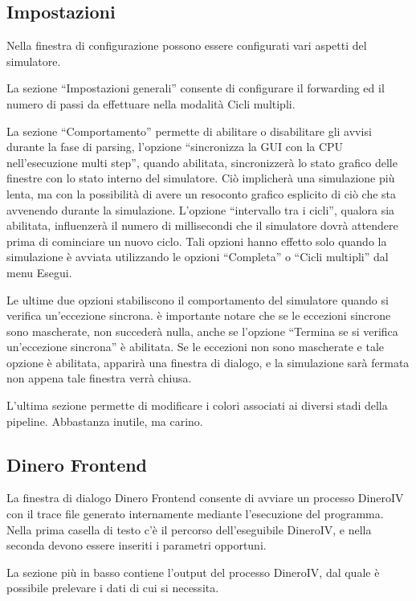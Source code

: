\documentclass[letterpaper,10pt,italian]{sphinxmanual}
\begin{document}
\subsection{Impostazioni}
\label{user-interface:impostazioni}
Nella finestra di configurazione possono essere configurati vari aspetti del
simulatore.

La sezione ``Impostazioni generali'' consente di configurare il forwarding ed il
numero di passi da effettuare nella modalità Cicli multipli.

La sezione ``Comportamento'' permette di abilitare o disabilitare gli avvisi
durante la fase di parsing, l'opzione ``sincronizza la GUI con la CPU
nell'esecuzione multi step'', quando abilitata, sincronizzerà lo stato
grafico delle finestre con lo stato interno del simulatore. Ciò
implicherà una simulazione più lenta, ma con la possibilità di
avere un resoconto grafico esplicito di ciò che sta avvenendo durante la
simulazione.  L'opzione ``intervallo tra i cicli'', qualora sia abilitata,
influenzerà il numero di millisecondi che il simulatore dovrà
attendere prima di cominciare un nuovo ciclo. Tali opzioni hanno effetto solo
quando la simulazione è avviata utilizzando le opzioni ``Completa'' o ``Cicli
multipli'' dal menu Esegui.

Le ultime due opzioni stabiliscono il comportamento del simulatore quando si
verifica un'eccezione sincrona.  è importante notare che se le eccezioni
sincrone sono mascherate, non succederà nulla, anche se l'opzione ``Termina
se si verifica un'eccezione sincrona'' è abilitata. Se le eccezioni non
sono mascherate e tale opzione è abilitata, apparirà una finestra di
dialogo, e la simulazione sarà fermata non appena tale finestra verrà
chiusa.

L'ultima sezione permette di modificare i colori associati ai diversi stadi
della pipeline. Abbastanza inutile, ma carino.


\subsection{Dinero Frontend}
\label{user-interface:dinero-frontend}
La finestra di dialogo Dinero Frontend consente di avviare un processo
DineroIV con il trace file generato internamente mediante l'esecuzione del
programma. Nella prima casella di testo c'è il percorso dell'eseguibile
DineroIV, e nella seconda devono essere inseriti i parametri opportuni.

La sezione più in basso contiene l'output del processo DineroIV, dal quale
è possibile prelevare i dati di cui si necessita.
\end{document}
